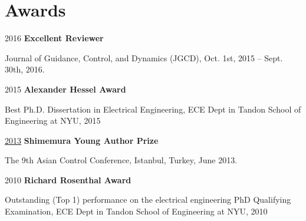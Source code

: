 \section{Awards}

\begin{twocolentry}{2016}
\textbf{Excellent Reviewer}\end{twocolentry}
\vspace{0.10 cm}
\begin{onecolentry}
\begin{highlights}
\item Journal of Guidance, Control, and Dynamics (JGCD), Oct. 1st, 2015 – Sept. 30th, 2016.
\end{highlights}
\end{onecolentry}
\vspace{0.20 cm}

\begin{twocolentry}{2015}
\textbf{Alexander Hessel Award}\end{twocolentry}
\vspace{0.10 cm}
\begin{onecolentry}
\begin{highlights}
\item Best Ph.D. Dissertation in Electrical Engineering, ECE Dept in Tandon School of Engineering at NYU, 2015
\end{highlights}
\end{onecolentry}
\vspace{0.20 cm}

\begin{twocolentry}{\href{http://acacontrol.org/awards/shimemura-young-author-prize/}{2013}}
\textbf{Shimemura Young Author Prize}\end{twocolentry}
\vspace{0.10 cm}
\begin{onecolentry}
\begin{highlights}
\item The 9th Asian Control Conference, Istanbul, Turkey, June 2013.
\end{highlights}
\end{onecolentry}
\vspace{0.20 cm}

\begin{twocolentry}{2010}
\textbf{Richard Rosenthal Award}\end{twocolentry}
\vspace{0.10 cm}
\begin{onecolentry}
\begin{highlights}
\item Outstanding (Top 1) performance on the electrical engineering PhD Qualifying Examination, ECE Dept in Tandon School of Engineering at NYU, 2010
\end{highlights}
\end{onecolentry}
\vspace{0.20 cm}


